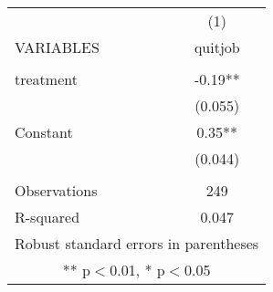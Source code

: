 \documentclass[]{article}
\begin{document}
\begin{tabular}{lc} \hline
 & (1) \\
VARIABLES & quitjob \\ \hline
 &  \\
treatment & -0.19** \\
 & (0.055) \\
Constant & 0.35** \\
 & (0.044) \\
 &  \\
Observations & 249 \\
 R-squared & 0.047 \\ \hline
\multicolumn{2}{c}{ Robust standard errors in parentheses} \\
\multicolumn{2}{c}{ ** p$<$0.01, * p$<$0.05} \\
\end{tabular}
\end{document}
